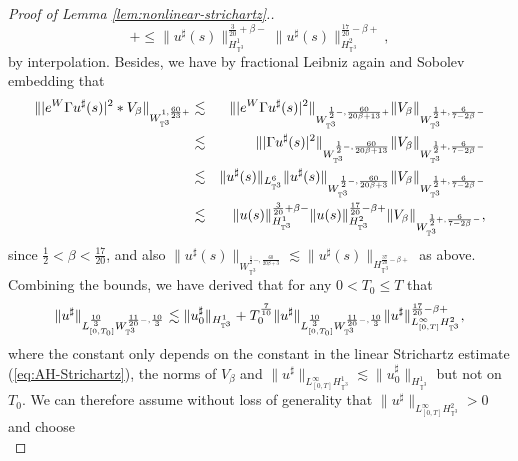 \begin{proof}[Proof of Lemma \ref{lem:nonlinear-strichartz}.]
\[{{{     +}} } \leq \| u^{\sharp} (s) \|^{\frac{3}{20} + \beta
     -}_{{H_{\mathbb{T}^3}^1} } \| u^{\sharp} (s) \|^{\frac{17}{20} - \beta
     +}_{{H_{\mathbb{T}^3}^2} }, \]
  by interpolation. Besides, we have by fractional Leibniz again and Sobolev
  embedding that
  \begin{eqnarray*}
    \| | e^W \Gamma u^{\sharp} (s) |^2 \ast V_{\beta} \|_{W_{\mathbb{T}^3}^{1,
    \frac{60}{23} +}} & \lesssim & \| | e^W \Gamma u^{\sharp} (s) |^2
    \|_{W^{\frac{1}{2} -, \frac{60}{20 \beta + 13} +}_{\mathbb{T}^3}} \|
    V_{\beta} \|_{W^{\frac{1}{2} +, \frac{6}{7 - 2 \beta} -}_{\mathbb{T}^3}}\\
    & \lesssim & \| | \Gamma u^{\sharp} (s) |^2 \|_{W^{\frac{1}{2} -,
    \frac{60}{20 \beta + 13}}_{\mathbb{T}^3}} \| V_{\beta} \|_{W^{\frac{1}{2}
    +, \frac{6}{7 - 2 \beta} -}_{\mathbb{T}^3}}\\
    & \lesssim & \| u^{\sharp} (s) \|_{L_{\mathbb{T}^3}^6} \| u^{\sharp} (s)
    \|_{W^{\frac{1}{2} -, \frac{60}{20 \beta + 3}}_{\mathbb{T}^3}} \|
    V_{\beta} \|_{W^{\frac{1}{2} +, \frac{6}{7 - 2 \beta} -}_{\mathbb{T}^3}}\\
    & \lesssim & \| u (s) \|^{\frac{3}{20} + \beta -}_{H_{\mathbb{T}^3}^1} \|
    u (s) \|^{{\color[HTML]{000000}\frac{17}{20} - \beta}
    +}_{H_{\mathbb{T}^3}^2} \| V_{\beta} \|_{W^{\frac{1}{2} +, \frac{6}{7 - 2
    \beta} -}_{\mathbb{T}^3}},
  \end{eqnarray*}
  since $\frac{1}{2} < \beta < \frac{17}{20}$, and also $\| u^{\sharp} (s)
  \|_{W^{\frac{1}{2} -, \frac{60}{20 \beta + 3}}_{\mathbb{T}^3}} \lesssim \|
  u^{\sharp} (s) \|_{{H_{\mathbb{T}^3}^{\frac{37}{20} - \beta +}} }$ as above. Combining the bounds, we have derived that for any $0 < T_0 \leqslant T$
  that
  \[ \| u^{\sharp} \|_{L^{\frac{10}{3}}_{[0, T_0]}
     W_{\mathbb{T}^3}^{\frac{11}{20} -, \frac{10}{3}}} \lesssim \|
     u_0^{\sharp} \|_{H_{\mathbb{T}^3}^1} + T_0^{\frac{7}{10}} \| u^{\sharp}
     \|_{L^{\frac{10}{3}}_{[0, T_0]} W_{\mathbb{T}^3}^{\frac{11}{20} -,
     \frac{10}{3}}} \| u^{\sharp} \|^{{\color[HTML]{000000}\frac{17}{20} -
     \beta} +}_{L_{[0, T]}^{\infty} H_{\mathbb{T}^3}^2}, \]
  where the constant only depends on the constant in the linear Strichartz
  estimate (\ref{eq:AH-Strichartz}), the norms of $V_{\beta}$ and $\|
  u^{\sharp} \|_{L_{[0, T]}^{\infty} H_{\mathbb{T}^3}^1} \lesssim \|
  u_0^{\sharp} \|_{H_{\mathbb{T}^3}^1}$ but not on $T_0$. We can therefore
  assume without loss of generality that $\| u^{\sharp} \|_{L_{[0,
  T]}^{\infty} H_{\mathbb{T}^3}^2} > 0$ and choose
  \begin{equation}

\end{equation}
\end{proof}
